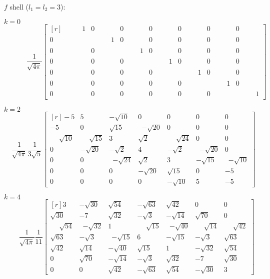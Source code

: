 \newpage
$f$ shell ($l_1=l_2=3$):

$k=0$
\begin{equation}
\phantom{\frac{5}{33\sqrt{13}}} \frac{1}{\sqrt{4\pi}}
\begin{bmatrix*}[r]
\phantom{-\sqrt{00}}1 & 0 & 0 & 0 & 0 & 0 & 0 \\
0 & \phantom{-\sqrt{00}}1 & 0 & 0 & 0 & 0 & 0 \\
0 & 0 & \phantom{-\sqrt{00}}1 & 0 & 0 & 0 & 0 \\
0 & 0 & 0 & \phantom{-\sqrt{00}}1 & 0 & 0 & 0 \\
0 & 0 & 0 & 0 & \phantom{-\sqrt{00}}1 & 0 & 0 \\
0 & 0 & 0 & 0 & 0 & \phantom{-\sqrt{00}}1 & 0 \\
0 & 0 & 0 & 0 & 0 & 0 & \phantom{-\sqrt{00}}1
\end{bmatrix*}
\end{equation}

$k=2$
\begin{equation}
\phantom{00} \frac{1}{\sqrt{4\pi}} \frac{1}{3\sqrt{5}}
\begin{bmatrix*}[r]
-5 & 5 & -\sqrt{10} & 0 & 0 & 0 & 0 \\ 
-5 & 0 & \sqrt{15} & \phantom{0}{-\sqrt{20}} & 0 & 0 & 0 \\ 
\phantom{0}{-\sqrt{10}} & \phantom{0}{-\sqrt{15}} & 3 & \sqrt{2} & \phantom{0}{-\sqrt{24}} & 0 & 0 \\ 
0 & -\sqrt{20} & -\sqrt{2} & 4 & -\sqrt{2} & \phantom{0}{-\sqrt{20}} & 0 \\ 
0 & 0 & \phantom{0}{-\sqrt{24}} & \sqrt{2} & 3 & -\sqrt{15} & \phantom{0}{-\sqrt{10}} \\ 
0 & 0 & 0 & -\sqrt{20} & \sqrt{15} & 0 & -5 \\ 
0 & 0 & 0 & 0 & -\sqrt{10} & 5 & -5
\end{bmatrix*}
\end{equation}

$k=4$
\begin{equation}
\phantom{000,} \frac{1}{\sqrt{4\pi}} \frac{1}{11}
\begin{bmatrix*}[r]
3 & -\sqrt{30} & \sqrt{54} & -\sqrt{63} & \sqrt{42} & 0 & 0 \\ 
\sqrt{30} & -7 & \sqrt{32} & -\sqrt{3} & -\sqrt{14} & \sqrt{70} & 0 \\ 
\phantom{-0}\sqrt{54} & \phantom{0}{-\sqrt{32}} & 1 & \phantom{-0}\sqrt{15} & \phantom{0}{-\sqrt{40}} & \phantom{-0}\sqrt{14} & \phantom{-0}\sqrt{42} \\ 
\sqrt{63} & -\sqrt{3} & \phantom{0}{-\sqrt{15}} & 6 & -\sqrt{15} & -\sqrt{3} & \sqrt{63} \\ 
\sqrt{42} & \sqrt{14} & -\sqrt{40} & \sqrt{15} & 1 & -\sqrt{32} & \sqrt{54} \\ 
0 & \sqrt{70} & -\sqrt{14} & -\sqrt{3} & \sqrt{32} & -7 & \sqrt{30} \\ 
0 & 0 & \sqrt{42} & -\sqrt{63} & \sqrt{54} & -\sqrt{30} & 3
\end{bmatrix*}
\end{equation}

